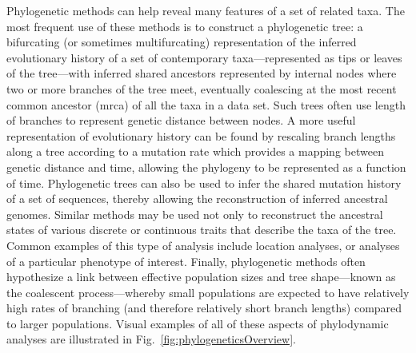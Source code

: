 
Phylogenetic methods can help reveal many features of a set of related taxa.
The most frequent use of these methods is to construct a phylogenetic tree: a bifurcating (or sometimes multifurcating) representation of the inferred evolutionary history of a set of contemporary taxa---represented as tips or leaves of the tree---with inferred shared ancestors represented by internal nodes where two or more branches of the tree meet, eventually coalescing at the most recent common ancestor (\gls{mrca}) of all the taxa in a data set.
Such trees often use length of branches to represent genetic distance between nodes.
A more useful representation of evolutionary history can be found by rescaling branch lengths along a tree according to a mutation rate which provides a mapping between genetic distance and time, allowing the phylogeny to be represented as a function of time.
Phylogenetic trees can also be used to infer the shared mutation history of a set of sequences, thereby allowing the reconstruction of inferred ancestral genomes.
Similar methods may be used not only to reconstruct the ancestral states of various discrete or continuous traits that describe the taxa of the tree.
Common examples of this type of analysis include location analyses, or analyses of a particular phenotype of interest.
Finally, phylogenetic methods often hypothesize a link between effective population sizes and tree shape---known as the coalescent process---whereby small populations are expected to have relatively high rates of branching (and therefore relatively short branch lengths) compared to larger populations.
Visual examples of all of these aspects of phylodynamic analyses are illustrated in Fig.~\ref{fig:phylogeneticsOverview}\cite{pybus2009evolutionary}.

